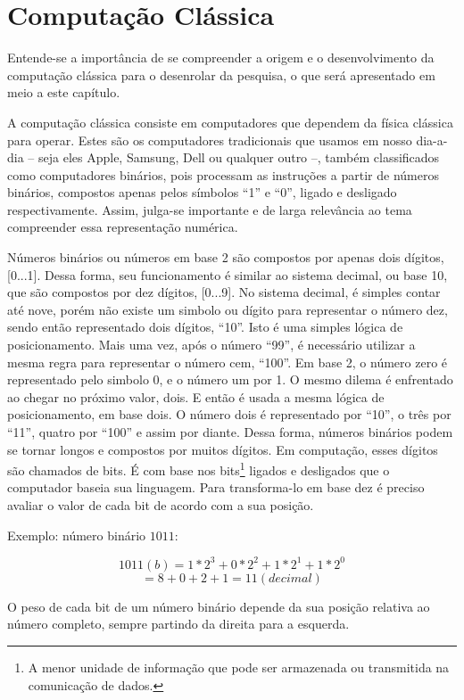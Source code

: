 \section{Computação Clássica} 
Entende-se a importância de se compreender a origem e o desenvolvimento da computação clássica para o desenrolar da pesquisa, o que será apresentado em meio a este capítulo.

A computação clássica consiste em computadores que dependem da física clássica para operar. Estes são os computadores tradicionais que usamos em nosso dia-a-dia – seja eles Apple, Samsung, Dell ou qualquer outro –, também classificados como computadores binários, pois processam as instruções a partir de números binários, compostos apenas pelos símbolos “1” e “0”, ligado e desligado respectivamente. Assim, julga-se importante e de larga relevância ao tema compreender essa representação numérica. 

Números binários ou números em base 2 são compostos por apenas dois dígitos, [0...1]. Dessa forma, seu funcionamento é similar ao sistema decimal, ou base 10, que são compostos por dez dígitos, [0...9]. No sistema decimal, é simples contar até nove, porém não existe um simbolo ou dígito para representar o número dez, sendo então representado  dois dígitos, “10”. Isto é uma simples lógica de posicionamento. Mais uma vez, após o número “99”, é necessário utilizar a mesma regra para representar o número cem, “100”. Em base 2, o número zero é representado pelo simbolo 0, e o número um por 1. O mesmo dilema é enfrentado ao chegar no próximo valor, dois. E então é usada a mesma lógica de posicionamento, em base dois. O número dois é representado por “10”, o três por “11”, quatro por “100” e assim por diante. Dessa forma, números binários podem se tornar longos e compostos por muitos dígitos. Em computação, esses dígitos são chamados de bits. \cite{6} É com base nos \label{bits}bits\footnote{A menor unidade de informação que pode ser armazenada ou transmitida na comunicação de dados.} ligados e desligados que o computador baseia sua linguagem. Para transforma-lo em base dez é preciso avaliar o valor de cada bit de acordo com a sua posição. 

Exemplo: número binário $1011$:

\[ 1011(b) = 1*2^3 + 0*2^2 + 1*2^1 + 1*2^0\]
\[ = 8 + 0 + 2 + 1 = 11(decimal)\]

O peso de cada bit de um número binário depende da sua posição relativa ao número completo, sempre partindo da direita para a esquerda.

